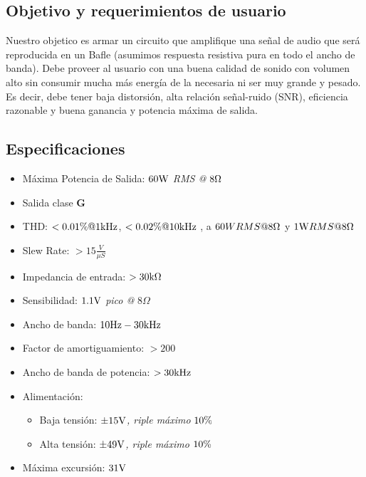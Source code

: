 \subsection{Objetivo y requerimientos de usuario}

Nuestro objetico es armar un circuito que amplifique una señal de audio que será reproducida en un Bafle (asumimos respuesta resistiva pura en todo el ancho de banda).  Debe proveer al usuario con una buena calidad de sonido con volumen alto sin consumir mucha más energía de la necesaria ni ser muy grande y pesado. Es decir, debe tener baja distorsión, alta relación señal-ruido (SNR), eficiencia razonable y buena ganancia y potencia máxima de salida.



\subsection{Especificaciones}

\bigskip

\begin{itemize}
	\item Máxima Potencia de Salida:  $60\si[per-mode=symbol]{\watt}$ \textit{RMS @} $8\si[per-mode=symbol]{\ohm}$
	\item Salida clase \textbf{G}
	\item THD: $< 0.01 \si[per-mode=symbol]{\percent} @ 1\si[per-mode=symbol]{\kilo\hertz}$, $<0.02 \si[per-mode=symbol]{\percent} @ 10\si[per-mode=symbol]{\kilo\hertz}$ , a $60W RMS@8\si[per-mode=symbol]{\ohm}$ y $1\si[per-mode=symbol]{\watt} RMS @8 \si[per-mode=symbol]{\ohm}$
	\item Slew Rate: $>15\frac{V}{\mu S}$
	\item Impedancia de entrada: $>30\si[per-mode=symbol]{\kilo\ohm}$
	\item Sensibilidad: $1.1\si[per-mode=symbol]{\volt}$ \textit{pico @} $8\Omega$
	\item Ancho de banda: $10\si[per-mode=symbol]{\hertz}-30\si[per-mode=symbol]{\kilo\hertz}$
	\item Factor de amortiguamiento: $>200$
	\item Ancho de banda de potencia: $>30\si[per-mode=symbol]{\kilo\hertz}$
	\item Alimentación: 
	\begin{itemize}
		\item Baja tensión: $ \pm 15\si[per-mode=symbol]{\volt}$\textit{, riple máximo} $10 \si[per-mode=symbol]{\percent}$
		\item Alta tensión: $ \pm 49\si[per-mode=symbol]{\volt}$\textit{, riple máximo} $10 \si[per-mode=symbol]{\percent}$
	\end{itemize}
	
	\item Máxima excursión: $31\si[per-mode=symbol]{\volt}$
\end{itemize}




